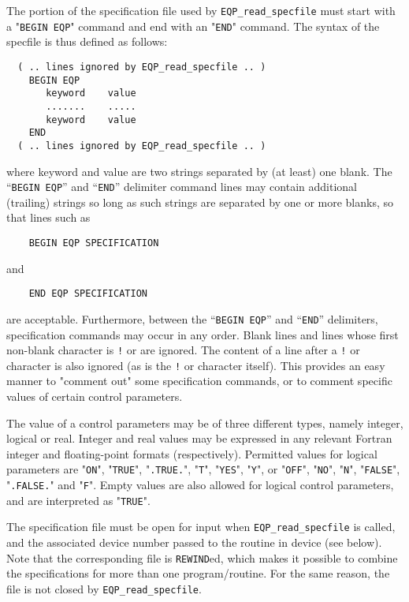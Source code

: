 \documentclass{galahad}
\newcommand{\packagename}{EQP}
\begin{document}
The portion of the specification file used by 
{\tt \packagename\_read\_specfile}
must start
with a "{\tt BEGIN \packagename}" command and end with an 
"{\tt END}" command.  The syntax of the specfile is thus defined as follows:
\begin{verbatim}
  ( .. lines ignored by EQP_read_specfile .. )
    BEGIN EQP
       keyword    value
       .......    .....
       keyword    value
    END 
  ( .. lines ignored by EQP_read_specfile .. )
\end{verbatim}
where keyword and value are two strings separated by (at least) one blank.
The ``{\tt BEGIN \packagename}'' and ``{\tt END}'' delimiter command lines 
may contain additional (trailing) strings so long as such strings are 
separated by one or more blanks, so that lines such as
\begin{verbatim}
    BEGIN EQP SPECIFICATION
\end{verbatim}
and
\begin{verbatim}
    END EQP SPECIFICATION
\end{verbatim}
are acceptable. Furthermore, 
between the
``{\tt BEGIN \packagename}'' and ``{\tt END}'' delimiters,
specification commands may occur in any order.  Blank lines and
lines whose first non-blank character is {\tt !} or {\tt *} are ignored. 
The content 
of a line after a {\tt !} or {\tt *} character is also 
ignored (as is the {\tt !} or {\tt *}
character itself). This provides an easy manner to "comment out" some 
specification commands, or to comment specific values 
of certain control parameters.  

The value of a control parameters may be of three different types, namely
integer, logical or real.
Integer and real values may be expressed in any relevant Fortran integer and
floating-point formats (respectively). Permitted values for logical
parameters are "{\tt ON}", "{\tt TRUE}", "{\tt .TRUE.}", "{\tt T}", 
"{\tt YES}", "{\tt Y}", or "{\tt OFF}", "{\tt NO}",
"{\tt N}", "{\tt FALSE}", "{\tt .FALSE.}" and "{\tt F}". 
Empty values are also allowed for 
logical control parameters, and are interpreted as "{\tt TRUE}".  

The specification file must be open for 
input when {\tt \packagename\_read\_specfile}
is called, and the associated device number 
passed to the routine in device (see below). 
Note that the corresponding 
file is {\tt REWIND}ed, which makes it possible to combine the specifications 
for more than one program/routine.  For the same reason, the file is not
closed by {\tt \packagename\_read\_specfile}.
\end{document}
